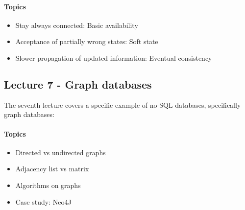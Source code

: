 		\paragraph*{Topics}
			\begin{itemize}
				\item Stay always connected: Basic availability
				\item Acceptance of partially wrong states: Soft state
				\item Slower propagation of updated information: Eventual consistency
			\end{itemize}


	\subsection{Lecture 7 - Graph databases}
		The seventh lecture covers a specific example of no-SQL databases, specifically graph databases:

		\paragraph*{Topics}
			\begin{itemize}
				\item Directed vs undirected graphs
				\item Adjacency list vs matrix
				\item Algorithms on graphs
				\item Case study: Neo4J
			\end{itemize}
